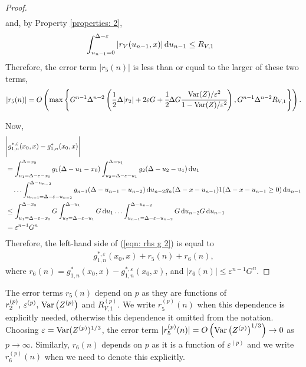 \begin{proof}
\begin{align*}
	\end{align*}
	and, by Property \ref{properties: 2}, 
	\begin{align*}
		&\int_{u_{n-1}=0}^{\Delta-\varepsilon}| r_V(u_{n-1},x)|\, \mathrm{d} u_{n-1} 
		\leq R_{V,1}
	\end{align*}
	Therefore, the error term \(|r_5(n)|\) is less than or equal to the larger of these two terms, 
	\begin{align*}
		|r_5(n)|= O\left(\max\left\{G^{n-1}\Delta^{n-2}\left(\frac{1}{2}\Delta|r_2 |+ 2\varepsilon G 
		+ \cfrac{1}{2}\Delta G\cfrac{\mathrm{Var}(Z)/\varepsilon^2}{1-\mathrm{Var}(Z)/\varepsilon^2}\right),
		G^{n-1}\Delta^{n-2}R_{V,1}\right\}\right).
	\end{align*}
	
	Now, 
	\begin{align*}
		&\Bigg|g_{1,n}^{*,\varepsilon}(x_0,x) - g_{1,n}^{*}(x_0,x)
		\Bigg|\nonumber
		\\&= \int_{u_1=\Delta-\varepsilon-x_0}^{\Delta-x_0}g_1(\Delta - u_1 - x_0)
		\int_{u_2=\Delta-\varepsilon-u_1}^{\Delta-u_1}g_2(\Delta - u_2 - u_1)\, \mathrm{d} u_1  \nonumber 
		\\&\quad\hdots 
            	\int_{u_{n-1}=\Delta-\varepsilon-u_{n-2}}^{\Delta-u_{n-2}} g_{n-1}(\Delta - u_{n-1} - u_{n-2}) \, \mathrm{d} u_{n-2}
            	g_{n}(\Delta - x-u_{n-1})1(\Delta - x-u_{n-1}\geq 0)\, \mathrm{d} u_{n-1}\nonumber
		\\&\leq \int_{u_1=\Delta-\varepsilon-x_0}^{\Delta-x_0}G 
		\int_{u_2=\Delta-\varepsilon-u_1}^{\Delta-u_1}G \, \mathrm{d} u_1  \hdots 
            	\int_{u_{n-1}=\Delta-\varepsilon-u_{n-2}}^{\Delta-u_{n-2}} G \, \mathrm{d} u_{n-2}\nonumber
            	G\, \mathrm{d} u_{n-1} 
		\\& = \varepsilon^{n-1}G ^n 
	\end{align*}
	Therefore, the left-hand side of (\ref{eqn: rhs g 2}) is equal to 
	\begin{align*}
		g^{*,\varepsilon}_{1,n}(x_0,x) + r_5(n) + r_6(n),
	\end{align*}
	where \(r_6(n) = g_{1,n}^{*}(x_0,x) - g_{1,n}^{*,\varepsilon}(x_0,x) \), and \(|r_6(n)|\leq \varepsilon^{n-1}G ^n\).
\end{proof}

The error terms \(r_5(n)\) depend on \(p\) as they are functions of \(r_2^{(p)},\, \varepsilon^{(p)},\, \mathrm{Var}\left(Z^{(p)}\right)\) and \(R_{V,1}^{(p)}\). We write \(r_5^{(p)}(n)\) when this dependence is explicitly needed, otherwise this dependence it omitted from the notation. Choosing \(\varepsilon = \mathrm{Var}(Z^{(p)})^{1/3}\), the error term \(|r_5^{(p)}(n)|= O\left(\mathrm{Var}\left(Z^{(p)}\right)^{1/3}\right)\to 0\) as \(p\to\infty\). Similarly, \(r_6(n)\) depends on \(p\) as it is a function of \(\varepsilon^{(p)}\) and we write \(r_6^{(p)}(n)\) when we need to denote this explicitly. 

